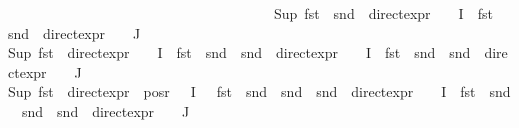 \begin{isabellebody}
\ \ \ \ \ \ \ \ \ \ \ \ \ \ \ \ \ \ \ \ \ \ \ \ \ \ \ \ \ \ \ \ \ \ \ \ {}\ {\isacharplus}{\kern0pt}\ Sup\ {\isacharparenleft}{\kern0pt}{\isacharparenleft}{\kern0pt}fst\ {\isasymcirc}\ snd\ {\isasymcirc}\ direct{\isacharunderscore}{\kern0pt}expr\ {\isasymcirc}\ {\isasymPhi}{\isacharparenright}{\kern0pt}\ {\isacharbackquote}{\kern0pt}\ I\ {\isasymunion}\ {\isacharparenleft}{\kern0pt}fst\ {\isasymcirc}\ snd\ {\isasymcirc}\ direct{\isacharunderscore}{\kern0pt}expr\ {\isasymcirc}\ {\isasymPhi}{\isacharparenright}{\kern0pt}\ {\isacharbackquote}{\kern0pt}\ J{\isacharparenright}{\kern0pt}{\isacharcomma}{\kern0pt}\ \isanewline
{\isacharparenleft}{\kern0pt}Sup\ {\isacharparenleft}{\kern0pt}{\isacharparenleft}{\kern0pt}fst\ {\isasymcirc}\ direct{\isacharunderscore}{\kern0pt}expr\ {\isasymcirc}\ {\isasymPhi}{\isacharparenright}{\kern0pt}\ {\isacharbackquote}{\kern0pt}\ I\ {\isasymunion}\ {\isacharparenleft}{\kern0pt}fst\ {\isasymcirc}\ snd\ {\isasymcirc}\ snd\ {\isasymcirc}\ direct{\isacharunderscore}{\kern0pt}expr\ {\isasymcirc}\ {\isasymPhi}{\isacharparenright}{\kern0pt}\ {\isacharbackquote}{\kern0pt}\ I\ {\isasymunion}\ {\isacharparenleft}{\kern0pt}fst\ {\isasymcirc}\ snd\ {\isasymcirc}\ snd\ {\isasymcirc}\ direct{\isacharunderscore}{\kern0pt}expr\ {\isasymcirc}\ {\isasymPhi}{\isacharparenright}{\kern0pt}\ {\isacharbackquote}{\kern0pt}\ J{\isacharparenright}{\kern0pt}{\isacharparenright}{\kern0pt}{\isacharcomma}{\kern0pt}\isanewline
{\isacharparenleft}{\kern0pt}Sup\ {\isacharparenleft}{\kern0pt}{\isacharparenleft}{\kern0pt}{\isacharparenleft}{\kern0pt}fst\ {\isasymcirc}\ direct{\isacharunderscore}{\kern0pt}expr{\isacharparenright}{\kern0pt}\ {\isacharbackquote}{\kern0pt}\ {\isacharparenleft}{\kern0pt}pos{\isacharunderscore}{\kern0pt}r\ {\isacharparenleft}{\kern0pt}{\isasymPhi}\ {\isacharbackquote}{\kern0pt}\ I{\isacharparenright}{\kern0pt}{\isacharparenright}{\kern0pt}{\isacharparenright}{\kern0pt}\ \ {\isasymunion}\ {\isacharparenleft}{\kern0pt}fst\ {\isasymcirc}\ snd\ {\isasymcirc}\ snd\ {\isasymcirc}\ snd\ {\isasymcirc}\ direct{\isacharunderscore}{\kern0pt}expr\ {\isasymcirc}\ {\isasymPhi}{\isacharparenright}{\kern0pt}\ {\isacharbackquote}{\kern0pt}\ I\ {\isasymunion}\ {\isacharparenleft}{\kern0pt}fst\ {\isasymcirc}\ snd\ {\isasymcirc}\ snd\ {\isasymcirc}\ snd\ {\isasymcirc}\ direct{\isacharunderscore}{\kern0pt}expr\ {\isasymcirc}\ {\isasymPhi}{\isacharparenright}{\kern0pt}\ {\isacharbackquote}{\kern0pt}\ J{\isacharparenright}{\kern0pt}{\isacharparenright}{\kern0pt}{\isacharcomma}{\kern0pt}\ \ \isanewline

\end{isabellebody}
